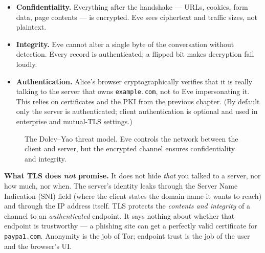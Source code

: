 \begin{itemize}
\item \textbf{Confidentiality.} Everything after the handshake --- URLs, cookies,
form data, page contents --- is encrypted. Eve sees ciphertext and traffic sizes,
not plaintext.
\item \textbf{Integrity.} Eve cannot alter a single byte of the conversation
without detection. Every record is authenticated; a flipped bit makes decryption
fail loudly.
\item \textbf{Authentication.} Alice's browser cryptographically verifies that it
is really talking to the server that owns \texttt{example.com}, not to Eve
impersonating it. This relies on certificates and the PKI from
the previous chapter. (By default only the server is authenticated; client
authentication is optional and used in enterprise and mutual-TLS settings.)
\end{itemize}

\begin{figure}[htbp]
\centering
{}
\caption{The Dolev--Yao threat model. Eve controls the network between the client and server, but the encrypted channel ensures confidentiality and integrity.}
\label{ch25:fig-dolev-yao}
\end{figure}


\begin{focusbox}
\textbf{What TLS does \emph{not} promise.} It does not hide \emph{that} you talked
to a server, nor how much, nor when. The server's identity leaks through the Server Name Indication (SNI)
field (where the client states the domain name it wants to reach) and through the IP address itself. TLS protects the
\emph{contents and integrity} of a channel to an \emph{authenticated} endpoint. It
says nothing about whether that endpoint is trustworthy --- a phishing site can
get a perfectly valid certificate for \texttt{paypa1.com}. Anonymity is the job of
Tor; endpoint trust is the job of the user and the browser's UI.
\end{focusbox}

